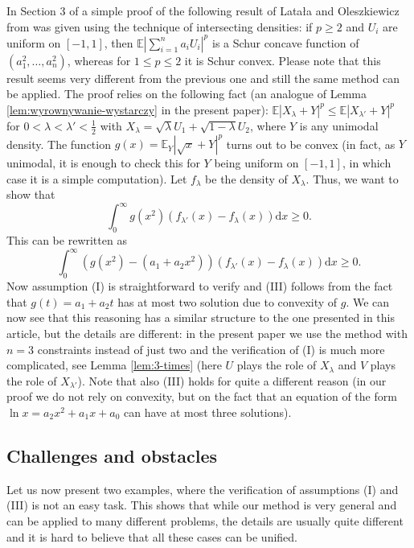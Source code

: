 \documentclass[11pt]{amsart}
\newcommand{\dd}{\mathrm{d}}
\newcommand{\1}{\mathbf{1}}
\newcommand{\E}{\mathbb{E}}
\theoremstyle{definition}
\theoremstyle{definition}
\theoremstyle{remark}
\begin{document}
In Section 3 of \cite{ENT18-2} a simple proof of the following result of Lata{\l}a and Oleszkiewicz from \cite{LO} was given using the technique of intersecting densities: if $p \geq 2$ and $U_i$ are uniform on $[-1,1]$, then $\E|\sum_{i=1}^n a_i U_i|^p$ is a Schur concave function of $(a_1^2,\ldots, a_n^2)$, whereas for $1 \leq p \leq 2$ it is Schur convex. Please note that this result seems very different from the previous one and still the same method can be applied. The proof relies on the following fact (an analogue of Lemma \ref{lem:wyrownywanie-wystarczy} in the present paper): $\E|X_\lambda+Y|^p \leq \E|X_{\lambda'}+Y|^p$ for $0<\lambda<\lambda'<\frac12$ with $X_\lambda = \sqrt{\lambda}U_1+\sqrt{1-\lambda} U_2$, where $Y$ is any unimodal density. The function $g(x)=\E_Y|\sqrt{x}+Y|^p$ turns out to be convex (in fact, as $Y$ unimodal, it is enough to check this for $Y$ being uniform on $[-1,1]$, in which case it is a simple computation). Let $f_\lambda$ be the density of $X_\lambda$. Thus, we want to show that
\[
	\int_0^\infty g(x^2)(f_{\lambda'}(x)-f_{\lambda}(x)) \dd x \geq 0.
\]
This can be rewritten as 
\[
	\int_0^\infty (g(x^2)-(a_1+a_2 x^2))(f_{\lambda'}(x)-f_{\lambda}(x)) \dd x \geq 0.
\]
Now assumption (I) is straightforward to verify and (III) follows from the fact that $g(t)=a_1+a_2t$ has at most two solution due to convexity of $g$. We can now see that this reasoning has a similar structure to the one presented in this article, but the details are different: in the present paper we use the method with $n=3$ constraints instead of just two and the verification of (I) is much more complicated, see Lemma \ref{lem:3-times} (here $U$ plays the role of $X_\lambda$ and $V$ plays the role of $X_{\lambda'}$). Note that also (III) holds  for quite a different reason (in our proof we do not rely on convexity, but on the fact that an equation of the form $\ln x = a_2x^2+a_1x+a_0$ can have at most three solutions). 


\subsection{Challenges and obstacles} 
Let us now present two examples, where the verification of assumptions (I) and (III) is not an easy task. This shows that while our method is very general and can be applied to many different problems, the details are usually quite different and it is hard to believe that all these cases can be unified. 
\end{document}
